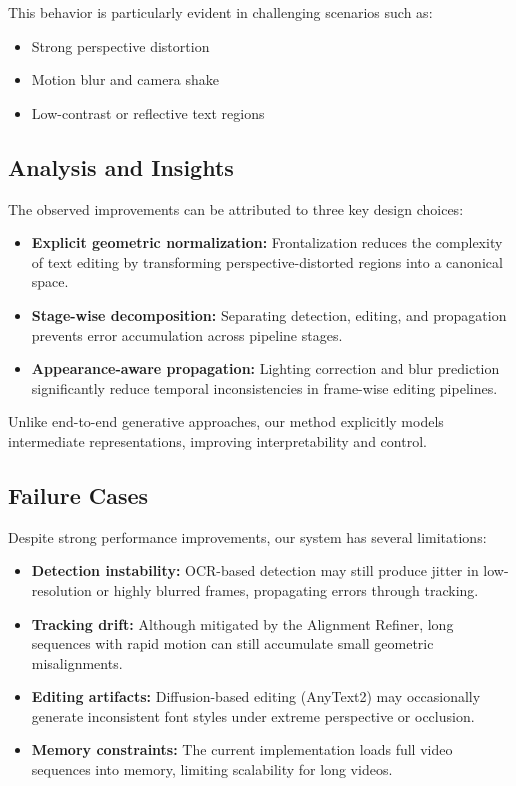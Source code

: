 This behavior is particularly evident in challenging scenarios such as:
\begin{itemize}
    \item Strong perspective distortion
    \item Motion blur and camera shake
    \item Low-contrast or reflective text regions
\end{itemize}

\subsection{Analysis and Insights}

The observed improvements can be attributed to three key design choices:

\begin{itemize}
    \item \textbf{Explicit geometric normalization:} Frontalization reduces the complexity of text editing by transforming perspective-distorted regions into a canonical space.
    \item \textbf{Stage-wise decomposition:} Separating detection, editing, and propagation prevents error accumulation across pipeline stages.
    \item \textbf{Appearance-aware propagation:} Lighting correction and blur prediction significantly reduce temporal inconsistencies in frame-wise editing pipelines.
\end{itemize}

Unlike end-to-end generative approaches, our method explicitly models intermediate representations, improving interpretability and control.

\subsection{Failure Cases}

Despite strong performance improvements, our system has several limitations:

\begin{itemize}
    \item \textbf{Detection instability:} OCR-based detection may still produce jitter in low-resolution or highly blurred frames, propagating errors through tracking.
    \item \textbf{Tracking drift:} Although mitigated by the Alignment Refiner, long sequences with rapid motion can still accumulate small geometric misalignments.
    \item \textbf{Editing artifacts:} Diffusion-based editing (AnyText2) may occasionally generate inconsistent font styles under extreme perspective or occlusion.
    \item \textbf{Memory constraints:} The current implementation loads full video sequences into memory, limiting scalability for long videos.
\end{itemize}

